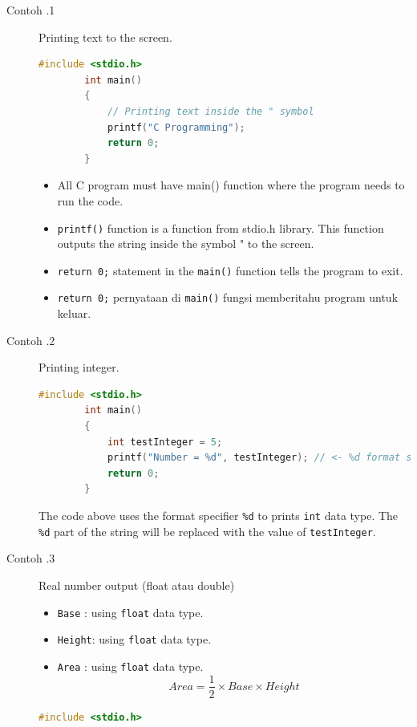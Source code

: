 \begin{description}
	\item[Contoh \thesubsection.1]  Printing text to the screen.
	\begin{lstlisting}[language=c,caption = Print text "C Programming" Ke layar,captionpos=t]
		#include <stdio.h>    
		int main()
		{ 
			// Printing text inside the " symbol
			printf("C Programming");
			return 0;
		}
	\end{lstlisting}
	\begin{itemize}
		\item All C program must have main() function where the program needs to run the code.
		\item \verb*|printf()| function is a function from stdio.h library. This function outputs the string inside the symbol " to the screen.
		\item \verb*|return 0;| statement in the \verb*|main()| function tells the program to exit.
		\item \verb*|return 0;| pernyataan di \verb*|main()| fungsi memberitahu program untuk keluar.
	\end{itemize}
	\item [Contoh \thesubsection.2] Printing integer.
	\begin{lstlisting}[language=c,captionpos=t]
		#include <stdio.h>
		int main()
		{
			int testInteger = 5;
			printf("Number = %d", testInteger); // <- %d format string
			return 0;
		}
	\end{lstlisting}
	
	
	The code above uses the format specifier \verb*|%d| to prints \verb*|int| data type. The \verb*|%d| part of the string will be replaced with the value of \verb*|testInteger|.

	\item[Contoh \thesubsection.3] Real number output (float atau double)
	\begin{itemize}\label{eq:LuasSegitiga}
		\item \verb|Base|  : using \verb|float| data type.
		\item \verb|Height|: using \verb|float| data type.
		\item \verb|Area|  : using \verb|float| data type.
		\begin{equation}
			Area = \frac{1}{2} \times Base \times Height
		\end{equation}
	\end{itemize}
	\begin{lstlisting}[language=c,captionpos=t]
		#include <stdio.h>
		

\end{lstlisting}
\end{description}
